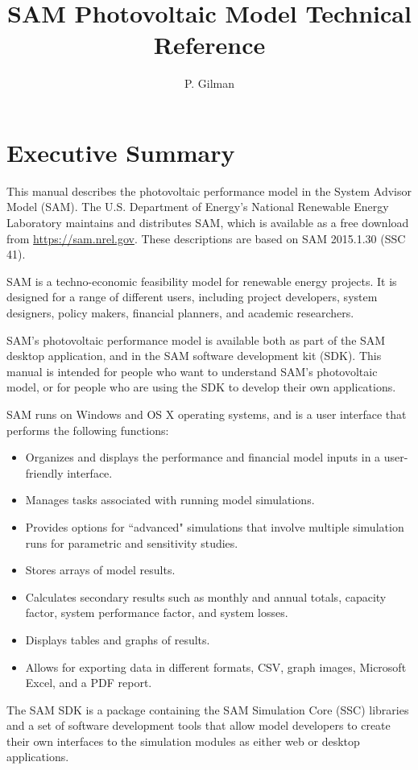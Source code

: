 \documentclass[12pt,letterpaper]{article}
\title{SAM Photovoltaic Model Technical Reference}
\author{P. Gilman}
\begin{document}
\frontmatter
\chapter*{Executive Summary}

This manual describes the photovoltaic performance model in the System Advisor Model (SAM). The U.S. Department of Energy's National Renewable Energy Laboratory maintains and distributes SAM, which is available as a free download from \url{https://sam.nrel.gov}. These descriptions are based on SAM 2015.1.30 (SSC 41).

SAM is a techno-economic feasibility model for renewable energy projects. It is designed for a range of different users, including project developers, system designers, policy makers, financial planners, and academic researchers.

SAM's photovoltaic performance model is available both as part of the SAM desktop application, and in the SAM software development kit (SDK). This manual is intended for people who want to understand SAM's photovoltaic model, or for people who are using the SDK to develop their own applications.

SAM runs on Windows and OS X operating systems, and is a user interface that performs the following functions:

\begin{itemize}
\item Organizes and displays the performance and financial model inputs in a user-friendly interface.
\item Manages tasks associated with running model simulations.
\item Provides options for ``advanced" simulations that involve multiple simulation runs for parametric and sensitivity studies.
\item Stores arrays of model results.
\item Calculates secondary results such as monthly and annual totals, capacity factor, system performance factor, and system losses.
\item Displays tables and graphs of results.
\item Allows for exporting data in different formats, CSV, graph images, Microsoft Excel, and a PDF report.
\end{itemize}

The SAM SDK is a package containing the SAM Simulation Core (SSC) libraries and a set of software development tools that allow model developers to create their own interfaces to the simulation modules as either web or desktop applications.
\end{document}
